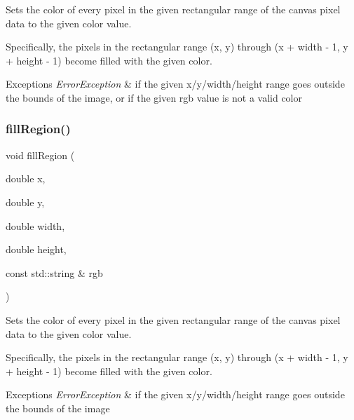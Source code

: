 Sets the color of every pixel in the given rectangular range of the canvas pixel data to the given color value. 

Specifically, the pixels in the rectangular range (x, y) through (x + width -\/ 1, y + height -\/ 1) become filled with the given color. 
\begin{DoxyExceptions}{Exceptions}
{\em Error\+Exception} & if the given x/y/width/height range goes outside the bounds of the image, or if the given rgb value is not a valid color \\
\hline
\end{DoxyExceptions}
\mbox{\label{classGCanvas_a762c611a5065687112018e7a0ab10c84}} 
\subsubsection{\texorpdfstring{fill\+Region()}{fillRegion()}\hspace{0.1cm}{\footnotesize\ttfamily [2/2]}}
{\footnotesize\ttfamily void fill\+Region (\begin{DoxyParamCaption}\item[{double}]{x,  }\item[{double}]{y,  }\item[{double}]{width,  }\item[{double}]{height,  }\item[{const std\+::string \&}]{rgb }\end{DoxyParamCaption})\hspace{0.3cm}{\ttfamily [virtual]}}



Sets the color of every pixel in the given rectangular range of the canvas pixel data to the given color value. 

Specifically, the pixels in the rectangular range (x, y) through (x + width -\/ 1, y + height -\/ 1) become filled with the given color. 
\begin{DoxyExceptions}{Exceptions}
{\em Error\+Exception} & if the given x/y/width/height range goes outside the bounds of the image \\
\hline
\end{DoxyExceptions}
\mbox{\label{classGObservable_a63e5e5a6227c59c928493b11aceb0f67}} 
